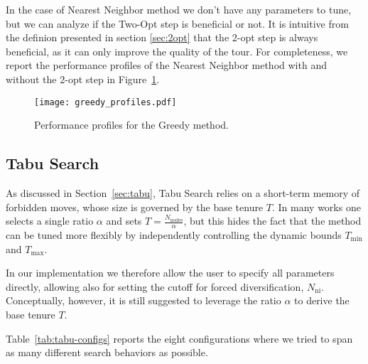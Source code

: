 In the case of Nearest Neighbor method we don't have any parameters to tune, but we can analyze if the Two-Opt step is beneficial or not. It is intuitive from the definion presented in section \ref{sec:2opt} that the 2-opt step is always beneficial, as it can only improve the quality of the tour. For completeness, we report the performance profiles of the Nearest Neighbor method with and without the 2-opt step in Figure~\ref{fig:nn-profiles}.

\begin{figure}[H]
  \centering
  \texttt{[image: greedy\_profiles.pdf]}
  \caption{Performance profiles for the Greedy method.}
  \label{fig:nn-profiles}
\end{figure}

\subsection{Tabu Search}
\label{ssec:tabu-tuning}
As discussed in Section~\ref{sec:tabu}, Tabu Search relies on a short-term memory of forbidden moves, whose size is governed by the base tenure \(T\).  In many works one selects a single ratio \(\alpha\) and sets \(T=\frac{N_{\mathrm{nodes}}}{\alpha}\), but this hides the fact that the method can be tuned more flexibly by independently controlling the dynamic bounds \(T_{\min}\) and \(T_{\max}\).

In our implementation we therefore allow the user to specify all parameters directly, allowing also for setting the cutoff for forced diversification, \(N_{\mathrm{ni}}\). Conceptually, however, it is still suggested to leverage the ratio \(\alpha\) to derive the base tenure \(T\).

Table~\ref{tab:tabu-configs} reports the eight configurations where we tried to span as many different search behaviors as possible.

